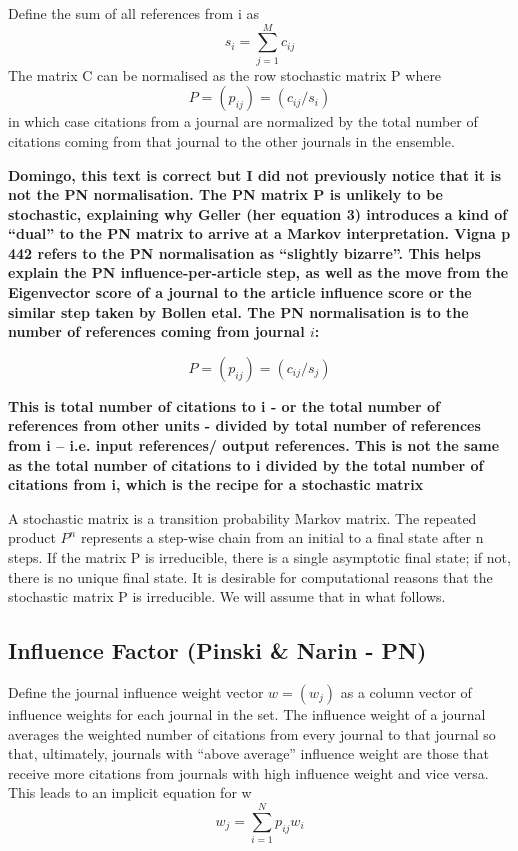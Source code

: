 \documentclass[10pt]{article}
\begin{document}
\noindent Define the sum of all references from i as
\begin{equation}
s_i = \sum_{j=1}^Mc_{ij}
\end{equation}
The matrix C can be normalised as the row stochastic matrix P where
\begin{equation}
P = (p_{ij}) = (c_{ij}/s_i)
\end{equation}
in which case citations from a journal are normalized by the total number of citations coming from that journal to the other journals in the ensemble.

\textbf{Domingo, this text is correct but I did not previously notice that it is not the PN normalisation. The PN matrix P is unlikely to be stochastic, explaining why Geller (her equation 3) introduces a kind of ``dual'' to the PN matrix to arrive at a Markov interpretation. Vigna p 442 refers to the PN normalisation as ``slightly bizarre''. This helps explain the PN influence-per-article step, as well as the move from the Eigenvector score of a journal to the article influence score or the similar step taken by Bollen etal.  The PN normalisation is to the number of references coming from journal $i$:}

\begin{equation}
P = (p_{ij}) = (c_{ij}/s_j)
\end{equation}

\textbf{This is total number of citations to i - or the total number of references from other units -  divided by total number of references from i -- i.e. input references/ output references. This is not the same as the total number of citations to i divided by the total number of citations from i, which is the recipe for a stochastic matrix}

A stochastic matrix is a transition probability Markov matrix. The repeated product $P^n$ represents a step-wise chain from an initial to a final state
after n steps. If the matrix P is irreducible, there is a single asymptotic final state; if
not, there is no unique final state. It is desirable for computational reasons that the stochastic matrix P  is irreducible. We will assume that in what follows.

\subsection{Influence Factor (Pinski \& Narin - PN)}
Define the journal influence weight vector
$w = (w_j)$ as a column vector of influence weights for each journal in the set. The influence
weight of a journal averages the weighted number of citations from every journal to that
journal so that, ultimately, journals with ``above average'' influence weight are those that
receive more citations from journals with high influence weight and vice versa. This
leads to an implicit equation for w
\begin{equation}
w_j =   \sum_{i=1}^{N}p_{ij}w_i
\end{equation}
\end{document}
